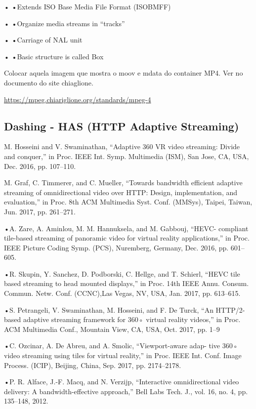 •	•Extends ISO Base Media File Format (ISOBMFF)

•	•Organize media streams in “tracks”

•	•Carriage of NAL unit

•	•Basic structure is called Box

Colocar aquela imagem que mostra o moov e mdata do container MP4. Ver no documento do site chiaglione.

\url{https://mpeg.chiariglione.org/standards/mpeg-4}



\subsection{Dashing - HAS (HTTP Adaptive Streaming)}

M. Hosseini and V. Swaminathan, “Adaptive 360 VR video streaming: Divide and conquer,” in Proc. IEEE Int. Symp. Multimedia (ISM), San Jose, CA, USA, Dec. 2016, pp. 107–110.

M. Graf, C. Timmerer, and C. Mueller, “Towards bandwidth efficient adaptive streaming of omnidirectional video over HTTP: Design, implementation, and evaluation,” in Proc. 8th ACM Multimedia Syst. Conf. (MMSys), Taipei, Taiwan, Jun. 2017, pp. 261–271.

•A. Zare, A. Aminlou, M. M. Hannuksela, and M. Gabbouj, “HEVC- compliant tile-based streaming of panoramic video for virtual reality applications,” in Proc. IEEE Picture Coding Symp. (PCS), Nuremberg, Germany, Dec. 2016, pp. 601–605.

•R. Skupin, Y. Sanchez, D. Podborski, C. Hellge, and T. Schierl, “HEVC tile based streaming to head mounted displays,” in Proc. 14th IEEE Annu. Consum. Commun. Netw. Conf. (CCNC),Las Vegas, NV, USA, Jan. 2017, pp. 613–615.

•S. Petrangeli, V. Swaminathan, M. Hosseini, and F. De Turck, “An HTTP/2-based adaptive streaming framework for 360◦ virtual reality videos,” in Proc. ACM Multimedia Conf., Mountain View, CA, USA, Oct. 2017, pp. 1–9

•C. Ozcinar, A. De Abreu, and A. Smolic, “Viewport-aware adap- tive 360◦ video streaming using tiles for virtual reality,” in Proc. IEEE Int. Conf. Image Process. (ICIP), Beijing, China, Sep. 2017, pp. 2174–2178.

•P. R. Alface, J.-F. Macq, and N. Verzijp, “Interactive omnidirectional video delivery: A bandwidth-effective approach,” Bell Labs Tech. J., vol. 16, no. 4, pp. 135–148, 2012.

